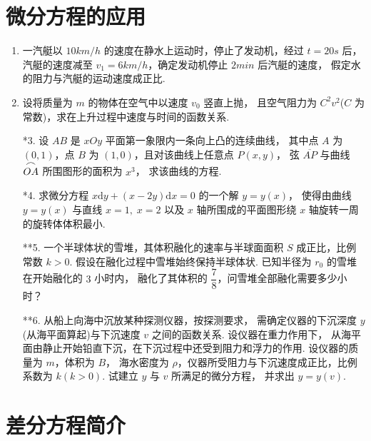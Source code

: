 \section{微分方程的应用}

\begin{enumerate}\setlength{\itemsep}{7pt}
    \item 一汽艇以 $10 km/h$ 的速度在静水上运动时，停止了发动机，经过 $t=20 s$ 后，
    汽艇的速度减至 $v_1=6km/h$，确定发动机停止 $2 min$ 后汽艇的速度，
    假定水的阻力与汽艇的运动速度成正比.

    \item 设将质量为 $m$ 的物体在空气中以速度 $v_0$ 竖直上抛，
    且空气阻力为 $C^2v^2$($C$ 为常数)，求在上升过程中速度与时间的函数关系.

    \item[*3.] 设 $AB$ 是 $xOy$ 平面第一象限内一条向上凸的连续曲线，
    其中点 $A$ 为 $(0,1)$，点 $B$ 为 $(1,0)$，且对该曲线上任意点 $P(x,y)$，
    弦 $\overline{AP}$ 与曲线 ${\stackrel{{\mbox{$\Large{\frown}$}}}{OA}}$ 所围图形的面积为 $x^3$，
    求该曲线的方程.

    \item[*4.] 求微分方程 $x\text{d}y+(x-2y)\text{d}x=0$ 的一个解 $y=y(x)$，
    使得由曲线 $y=y(x)$ 与直线 $x=1,\;x=2$ 以及 $x$ 轴所围成的平面图形绕 $x$ 轴旋转一周的旋转体体积最小.

    \item[**5.] 一个半球体状的雪堆，其体积融化的速率与半球面面积 $S$ 成正比，比例常数 $k>0$. 
    假设在融化过程中雪堆始终保持半球体状. 已知半径为 $r_0$ 的雪堆在开始融化的 $3$ 小时内，
    融化了其体积的 $\dfrac{7}{8}$，问雪堆全部融化需要多少小时？

    \item[**6.] 从船上向海中沉放某种探测仪器，按探测要求，
    需确定仪器的下沉深度 $y$(从海平面算起)与下沉速度 $v$ 之间的函数关系. 设仪器在重力作用下，
    从海平面由静止开始铅直下沉，在下沉过程中还受到阻力和浮力的作用. 设仪器的质量为 $m$，体积为 $B$，
    海水密度为 $\rho$，仪器所受阻力与下沉速度成正比，比例系数为 $k(k>0)$. 试建立 $y$ 与 $v$ 所满足的微分方程，
    并求出 $y=y(v)$.
\end{enumerate}

\section{差分方程简介}

